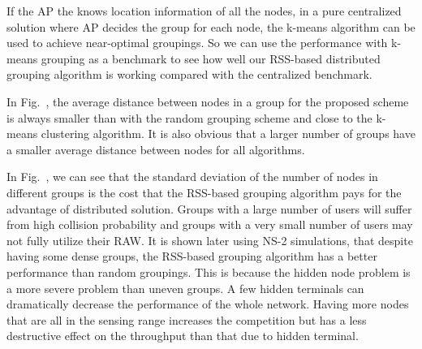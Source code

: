 
If the AP the knows location information of all the nodes, in a pure centralized solution where AP decides the group for each node, the k-means algorithm can be used to achieve near-optimal groupings. So we can use the performance with k-means grouping as a benchmark to see how well our RSS-based distributed grouping algorithm is working compared with the centralized benchmark.

In Fig.~, the average distance between nodes in a group for the proposed scheme is always smaller than with the random grouping scheme and close to the k-means clustering algorithm. It is also obvious that a larger number of groups have a smaller average distance between nodes for all algorithms. 

In Fig.~, we can see that the standard deviation of the number of nodes in different groups is the cost that the RSS-based grouping algorithm pays for the advantage of distributed solution. Groups with a large number of users will suffer from high collision probability and groups with a very small number of users may not fully utilize their RAW. It is shown later using NS-2 simulations, that despite having some dense groups, the RSS-based grouping algorithm has a better performance than random groupings. This is because the hidden node problem is a more severe problem than uneven groups. A few hidden terminals can dramatically decrease the performance of the whole network. Having more nodes that are all in the sensing range increases the competition but has a less destructive effect on the throughput than that due to hidden terminal.



